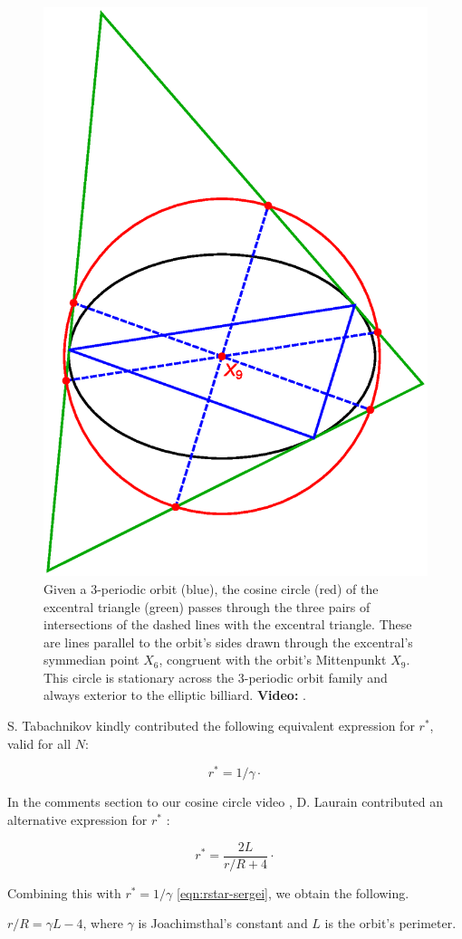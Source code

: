\begin{figure}[H]
    \centering
    \includegraphics[width=.65\textwidth]{1080_cosine_circle_locus_antiparallels.eps}
    \caption{Given a 3-periodic orbit (blue), the cosine circle (red) of the excentral triangle (green) passes through the three pairs of intersections of the dashed lines with the excentral triangle. These are lines parallel to the orbit's sides drawn through the excentral's symmedian point $X_6$, congruent with the orbit's Mittenpunkt $X_9$. This circle is stationary across the 3-periodic orbit family and always exterior to the elliptic billiard. \textbf{Video:} \cite[PL\#04]{reznik2020-playlist-proofs}.}
    \label{fig:cos-circle}
\end{figure}

\begin{remark}
S. Tabachnikov kindly contributed 
\cite{reznik2019-intelligencer} the following equivalent expression for $r^*$, valid for all $N$:

\begin{equation}
    r^* = 1/\gamma\cdot
\label{eqn:rstar-sergei}
\end{equation}
\end{remark}

\begin{remark}

In the comments section to our cosine circle video \cite[PL\#05]{reznik2020-playlist-proofs}, D. Laurain contributed an alternative expression for $r^*$ \cite{dominique19}:

\begin{equation}
    r^* = \frac{2 L}{r/R+4}\cdot
    \label{eqn:rstar-laurain}
\end{equation}
\end{remark}

\noindent Combining this with $r^*=1/\gamma$ \eqref{eqn:rstar-sergei}, we obtain the following.

\begin{theorem}
${r/R}={\gamma}L-4$, where $\gamma$ is Joachimsthal's constant and $L$ is the orbit's perimeter.
\label{thm:rovR-explicit}
\end{theorem}